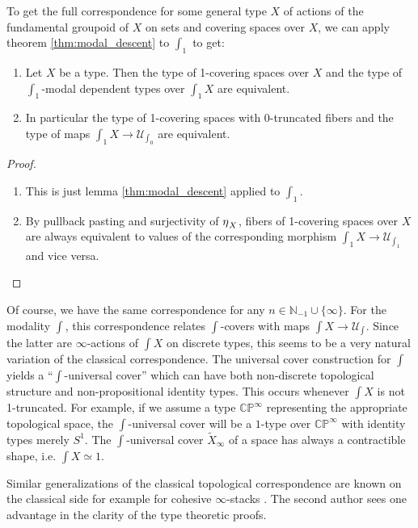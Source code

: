 \documentclass[9pt,twosided]{amsart}
\newcommand{\shape}{\int}
\newcommand{\bC}{\mathbb C}
\newcommand{\bN}{\mathbb N}
\newcommand{\bP}{\mathbb P}
\begin{document}
To get the full correspondence for some general type $X$ of actions of the fundamental groupoid of $X$ on sets and covering spaces over $X$,
we can apply theorem \ref{thm:modal_descent} to $\shape_1$ to get:

\begin{thm}
  \begin{enumerate}
  \item Let $X$ be a type. Then the type of 1-covering spaces over $X$ and the type of $\shape_1$-modal dependent types over $\shape_1 X$ are equivalent.
  \item In particular the type of 1-covering spaces with 0-truncated fibers and the type of maps $\shape_1X\to \mathcal U_{\shape_0}$ are equivalent.
  \end{enumerate}
\end{thm}
\begin{proof}
  \begin{enumerate}
  \item This is just lemma \ref{thm:modal_descent} applied to $\shape_1$.
  \item By pullback pasting and surjectivity of ${\eta_{}}_X$, fibers of 1-covering spaces over $X$ are always equivalent to values of the corresponding morphism $\shape_1 X\to \mathcal U_{\shape_1}$ and vice versa.
  \end{enumerate}
\end{proof}

Of course, we have the same correspondence for any $n\in\bN_{-1}\cup\{\infty\}$.
For the modality $\shape$, this correspondence relates $\shape$-covers with 
maps $\shape X\to\mathcal U_{\shape}$.
Since the latter are $\infty$-actions of $\shape X$ on discrete types, this seems to be a very natural variation of the classical correspondence.
The universal cover construction for $\shape$ yields a ``$\shape$-universal cover'' 
which can have both non-discrete topological structure and
non-propositional identity types.
This occurs whenever $\shape X$ is not 1-truncated.
For example, if we assume a type $\bC\bP^\infty$ representing the appropriate topological space,
the $\shape$-universal cover will be a $1$-type over $\bC\bP^\infty$ with identity types merely $S^1$.
The $\shape$-universal cover $\widetilde{X}_\infty$ of a space has always a contractible shape, i.e. $\shape X \simeq 1$.


Similar generalizations of the classical topological correspondence are known on the classical side
for example for cohesive $\infty$-stacks \cite[Section 5.2.7]{SchreiberDcct}.
The second author sees one advantage in the clarity of the type theoretic proofs.
\end{document}

